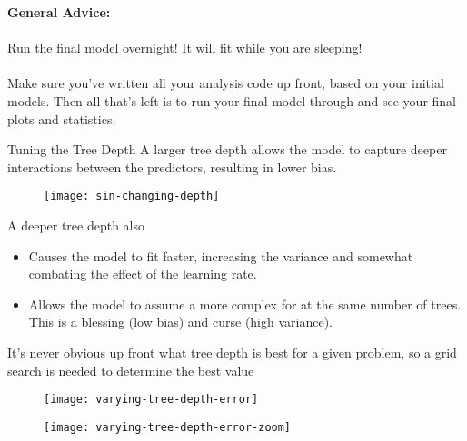 %
\begin{frame}
\textbf{General Advice:}\\~\\

Run the final model overnight!  It will fit while you are sleeping!\\~\\

Make sure you've written all your analysis code up front, based on your initial models.  Then all that's left is to run your final model through and see your final plots and statistics.
\end{frame}

%
\begin{frame}{Tuning the Tree Depth}
A larger tree depth allows the model to capture deeper interactions between the predictors, resulting in lower bias.

  \begin{figure}
    \texttt{[image: sin-changing-depth]}
  \end{figure}

\end{frame}
%
\begin{frame}
A deeper tree depth also

\begin{itemize}
  \item Causes the model to fit faster, increasing the variance and somewhat combating the effect of the learning rate.
  \item Allows the model to assume a more complex for at the same number of trees.  This is a blessing (low bias) and curse (high variance).
\end{itemize}
\end{frame}
%
\begin{frame}
It's never obvious up front what tree depth is best for a given problem, so a grid search is needed to determine the best value

  \begin{figure}
    \texttt{[image: varying-tree-depth-error]}
  \end{figure}
  
\end{frame}
%
\begin{frame}

  \begin{figure}
    \texttt{[image: varying-tree-depth-error-zoom]}
  \end{figure}
  
\end{frame}
